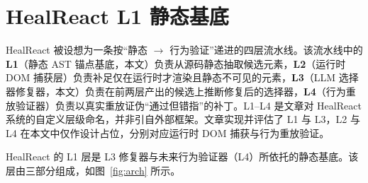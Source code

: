 \section{HealReact L1 静态基底}
\label{sec:l1}

HealReact 被设想为一条按“静态 $\to$ 行为验证”递进的四层流水线。该流水线中的 \textbf{L1}（静态 AST 锚点基底，本文）负责从源码静态抽取候选元素，\textbf{L2}（运行时 DOM 捕获层）负责补足仅在运行时才渲染且静态不可见的元素，\textbf{L3}（LLM 选择器修复器，本文）负责在前两层产出的候选上推断修复后的选择器，\textbf{L4}（行为重放验证器）负责以真实重放证伪“通过但错指”的补丁。L1--L4 是文章对 HealReact 系统的自定义层级命名，并非引自外部框架。文章实现并评估了 L1 与 L3，L2 与 L4 在本文中仅作设计占位，分别对应运行时 DOM 捕获与行为重放验证。

HealReact 的 L1 层是 L3 修复器与未来行为验证器（L4）所依托的静态基底。该层由三部分组成，如图~\ref{fig:arch} 所示。

